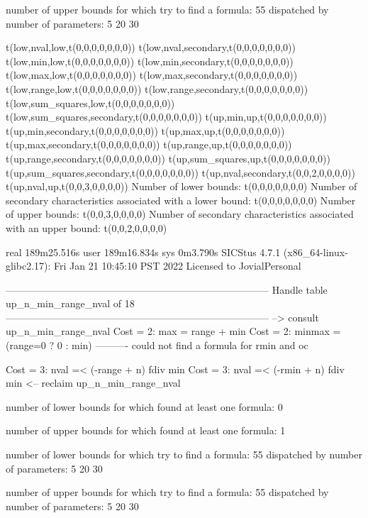 number of upper bounds for which try to find a formula: 55
dispatched by number of parameters: 5  20  30

t(low,nval,low,t(0,0,0,0,0,0,0))
t(low,nval,secondary,t(0,0,0,0,0,0,0))
t(low,min,low,t(0,0,0,0,0,0,0))
t(low,min,secondary,t(0,0,0,0,0,0,0))
t(low,max,low,t(0,0,0,0,0,0,0))
t(low,max,secondary,t(0,0,0,0,0,0,0))
t(low,range,low,t(0,0,0,0,0,0,0))
t(low,range,secondary,t(0,0,0,0,0,0,0))
t(low,sum_squares,low,t(0,0,0,0,0,0,0))
t(low,sum_squares,secondary,t(0,0,0,0,0,0,0))
t(up,min,up,t(0,0,0,0,0,0,0))
t(up,min,secondary,t(0,0,0,0,0,0,0))
t(up,max,up,t(0,0,0,0,0,0,0))
t(up,max,secondary,t(0,0,0,0,0,0,0))
t(up,range,up,t(0,0,0,0,0,0,0))
t(up,range,secondary,t(0,0,0,0,0,0,0))
t(up,sum_squares,up,t(0,0,0,0,0,0,0))
t(up,sum_squares,secondary,t(0,0,0,0,0,0,0))
t(up,nval,secondary,t(0,0,2,0,0,0,0))
t(up,nval,up,t(0,0,3,0,0,0,0))
Number of lower bounds:                                             t(0,0,0,0,0,0,0)
Number of secondary characteristics associated with a lower bound:  t(0,0,0,0,0,0,0)
Number of upper bounds:                                             t(0,0,3,0,0,0,0)
Number of secondary characteristics associated with an upper bound: t(0,0,2,0,0,0,0)

real	189m25.516s
user	189m16.834s
sys	0m3.790s
SICStus 4.7.1 (x86_64-linux-glibc2.17): Fri Jan 21 10:45:10 PST 2022
Licensed to JovialPersonal


--------------------------------------------------------------------------------
Handle table up_n_min_range_nval of 18
--------------------------------------------------------------------------------
--> consult up_n_min_range_nval
Cost =  2:  max    = range + min
Cost =  2:  minmax = (range=0 ? 0 : min)
----------
could not find a formula for rmin and oc

Cost =  3:  nval =< (-range + n) fdiv min
Cost =  3:  nval =< (-rmin + n) fdiv min
<-- reclaim up_n_min_range_nval

number of lower bounds for which found at least one formula: 0

number of upper bounds for which found at least one formula: 1

number of lower bounds for which try to find a formula: 55
dispatched by number of parameters: 5  20  30

number of upper bounds for which try to find a formula: 55
dispatched by number of parameters: 5  20  30

